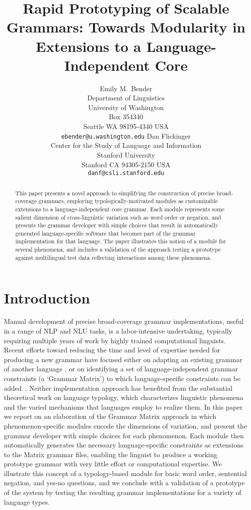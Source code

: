 \documentclass[11pt]{article}
\title{Rapid Prototyping of Scalable Grammars: Towards Modularity in Extensions to a Language-Independent Core}
\author{Emily M.~Bender\\
  Department of Linguistics\\
  University of Washington\\
  Box 354340\\
  Seattle WA 98195-4340 USA\\
  {\tt ebender@u.washington.edu} \And
  Dan Flickinger \\
  Center for the Study of Language and Information\\
  Stanford University\\
  Stanford CA 94305-2150 USA\\
  {\tt danf@csli.stanford.edu}}
\date{}
\begin{document}
\maketitle

\begin{abstract}
This paper presents a novel approach to simplifying the construction
of precise broad-coverage grammars, employing typologically-motivated
modules as customizable extensions to a language-independent core
grammar.  Each module represents some salient dimension of
cross-linguistic variation such as word order or negation, and
presents the grammar developer with simple choices that result in
automatically generated language-specific software that becomes part
of the grammar implementation for that language.  The paper
illustrates this notion of a module for several phenomena, and
includes a validation of the approach testing a prototype against
multilingual test data reflecting interactions among these phenomena.
\end{abstract}

\section{Introduction}

Manual development of precise broad-coverage grammar implementations,
useful in a range of NLP and NLU tasks, 
is a labor-intensive undertaking, typically requiring multiple years
of work by highly trained computational linguists.  Recent
efforts toward reducing the time and level of expertise
needed for producing a new grammar have focused either on adapting an
existing grammar of another language
\cite{Butt-et-al-02,Kim:Dal:Kap:Kin:Mas:Ohk:03,Bat:Kru:Kru:ta}, or on
identifying a set of language-independent grammar constraints (a `Grammar
Matrix') to which
language-specific constraints can be added~\cite{Ben:Fli:Oe:02}.
Neither implementation approach has benefited from the substantial
theoretical work on language typology, which characterizes linguistic
phenomena and the varied mechanisms that languages employ to realize
them.  In this paper we report on an elaboration of the Grammar Matrix
approach in which phenomenon-specific modules encode the dimensions of
variation, and present the grammar developer with simple choices 
for each phenomenon. Each module then
automatically generates the necessary language-specific constraints as
extensions to the Matrix grammar files, enabling the linguist to
produce a working prototype grammar with very little effort or
computational expertise.  We illustrate this concept of a
typology-based module for basic word order, sentential negation, and
yes-no questions, and we conclude with a validation of a prototype of
the system by testing the resulting grammar implementations for a variety
of language types.
\end{document}
